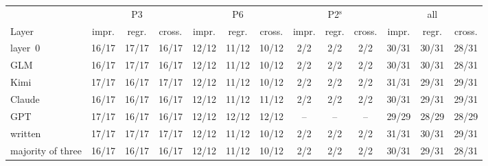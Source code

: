\setlength{\tabcolsep}{3pt}\begin{tabular}{@{}lccccccccc ccc@{}}
  \toprule
  & \multicolumn{3}{c}{P3} & \multicolumn{3}{c}{P6} & \multicolumn{3}{c}{P2$^{\mathrm{s}}$} & \multicolumn{3}{c}{all} \\
  \cmidrule(lr){2-4}\cmidrule(lr){5-7}\cmidrule(lr){8-10}\cmidrule(lr){11-13}
  Layer & impr. & regr. & cross. & impr. & regr. & cross. & impr. & regr. & cross. & impr. & regr. & cross. \\
  \midrule
  layer~0 & 16/17 & 17/17 & 16/17 & 12/12 & 11/12 & 10/12 & 2/2 & 2/2 & 2/2 & 30/31 & 30/31 & 28/31 \\
  GLM & 16/17 & 17/17 & 16/17 & 12/12 & 11/12 & 10/12 & 2/2 & 2/2 & 2/2 & 30/31 & 30/31 & 28/31 \\
  Kimi & 17/17 & 16/17 & 17/17 & 12/12 & 11/12 & 10/12 & 2/2 & 2/2 & 2/2 & 31/31 & 29/31 & 29/31 \\
  Claude & 16/17 & 16/17 & 16/17 & 12/12 & 11/12 & 11/12 & 2/2 & 2/2 & 2/2 & 30/31 & 29/31 & 29/31 \\
  GPT & 17/17 & 16/17 & 16/17 & 12/12 & 12/12 & 12/12 & -- & -- & -- & 29/29 & 28/29 & 28/29 \\
  written & 17/17 & 17/17 & 17/17 & 12/12 & 11/12 & 10/12 & 2/2 & 2/2 & 2/2 & 31/31 & 30/31 & 29/31 \\
  majority of three & 16/17 & 16/17 & 16/17 & 12/12 & 11/12 & 10/12 & 2/2 & 2/2 & 2/2 & 30/31 & 29/31 & 28/31 \\
  \bottomrule
\end{tabular}
\par\vspace{1pt}{\raggedright\scriptsize Each cell: lineages whose conclusion under the layer equals the defect-corrected conclusion / lineages where the layer rates every checkpoint.\par}
